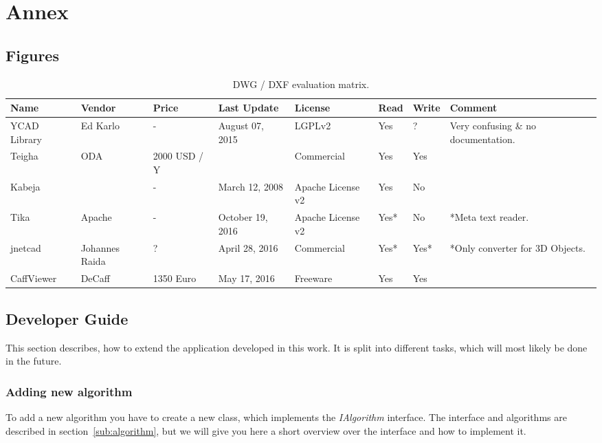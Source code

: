 \section{Annex}

\subsection{Figures}
\begin{table}[h]
\centering
\caption{DWG / DXF evaluation matrix.}
\label{tbl:DWGEvaluationMatrix}
\begin{tabular}{@{}llllllll@{}}
\toprule
Name         & Vendor         & Price        & Last Update      & License           & Read & Write & Comment                             \\ \midrule
YCAD Library & Ed Karlo       & -            & August 07, 2015  & LGPLv2            & Yes  & ?     & Very confusing \& no documentation. \\
Teigha       & ODA            & 2000 USD / Y &                  & Commercial        & Yes  & Yes   &                                     \\
Kabeja       &                & -            & March 12, 2008   & Apache License v2 & Yes  & No    &                                     \\
Tika         & Apache         & -            & October 19, 2016 & Apache License v2 & Yes* & No    & *Meta text reader.                  \\
jnetcad      & Johannes Raida & ?            & April 28, 2016   & Commercial        & Yes* & Yes*  & *Only converter for 3D Objects.     \\
CaffViewer   & DeCaff         & 1350 Euro    & May 17, 2016     & Freeware          & Yes  & Yes   &                                     \\ \bottomrule
\end{tabular}
\end{table}

\pagebreak
\subsection{Developer Guide}
This section describes, how to extend the application developed in this work. It is split into different tasks, which will most likely be done in the future.

\subsubsection{Adding new algorithm}
To add a new algorithm you have to create a new class, which implements the \textit{IAlgorithm} interface. The interface and algorithms are described in section~\ref{sub:algorithm}, but we will give you here a short overview over the interface and how to implement it.

